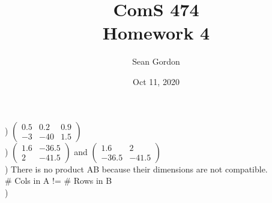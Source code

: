 \documentclass[12pt]{article}
\title{ComS 474\\Homework 4}
\author{Sean Gordon}
\date{Oct 11, 2020}
\begin{document}
\maketitle



) $
\begin{pmatrix}
0.5 & 0.2 & 0.9\\
-3 & -40 & 1.5
\end{pmatrix}$\\[.4em]

) $
\begin{pmatrix}
1.6 & -36.5\\
2 & -41.5
\end{pmatrix}$
 and $
\begin{pmatrix}
1.6 & 2\\
-36.5 & -41.5
\end{pmatrix}$\\[.4em]

) There is no product AB because their dimensions are not compatible. \\
\indent \# Cols in A != \# Rows in B\\

) 



\end{document}

